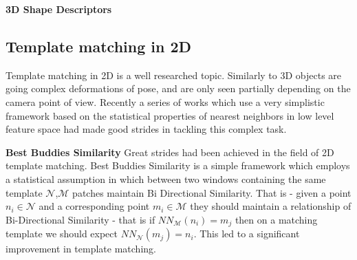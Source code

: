 \documentclass[10pt,twocolumn,letterpaper]{article}
\begin{document}
\textbf{3D Shape Descriptors} 


\subsection{Template matching in 2D}
Template matching in 2D is a well researched topic. Similarly to 3D objects are going complex deformations of pose, and are only seen partially depending on the camera point of view. Recently a series of works which use a very simplistic framework based on the statistical properties of nearest neighbors in low level feature space had made good strides in tackling this complex task.

\textbf{Best Buddies Similarity}
Great strides had been achieved in the field of 2D template matching. Best Buddies Similarity\cite{dekel2015best} is a simple framework which employs a statistical assumption in which between two windows containing the same template $\mathcal{N}$,$\mathcal{M}$ patches maintain Bi Directional Similarity. 
That is - given a point $n_i\in\mathcal{N}$ and a corresponding point $m_i\in\mathcal{M}$ they should maintain a relationship of Bi-Directional Similarity - that is if $NN_{\mathcal{M}}(n_i)=m_j$ then on a matching template we should expect $NN_{\mathcal{N}}(m_j)=n_i$. This led to a significant improvement in template matching.
\end{document}
